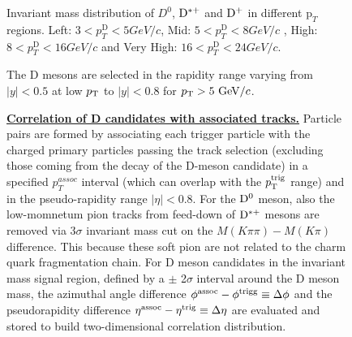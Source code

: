 \begin{enumerate}
\begin{figure}[h]
\caption{Invariant mass distribution of $D^0$, ${\rm D^{*+}}$ and ${\rm D^+}$ in different $\text{p}_T$ regions. Left: $3< p_{T}^{\text{D}}< 5 GeV/c$, Mid: $5< p_{T}^{\text{D}}< 8 GeV/c$ , High: $8< p_{T}^{\text{D}}< 16 GeV/c$ and Very High: $16<p_{T}^{\text{D}}< 24 GeV/c$.}
\label{fig:InvMass}
\end{figure}
\begin{figure}[h]


The D mesons are selected in the rapidity range varying from $|y|<0.5$ at low $p_{\rm T}$ to $|y|<0.8$ for $p_{\rm T}>5~\mathrm{GeV}/c$. %

\item
\underline {\bf Correlation of D candidates with associated tracks.}
Particle pairs are formed by associating each trigger particle with
the charged primary particles passing the track selection (excluding those coming from the decay of the D-meson candidate) in a specified $p^{assoc}_{T}$
interval (which can overlap with the $p_{\rm T}^{\rm trig}$ range) and in the pseudo-rapidity range $|\eta|<0.8$. For the ${\rm D^0}$ meson, also the low-momnetum pion tracks from feed-down of ${\rm D^{*+}}$ mesons are removed via 3$\sigma$ invariant mass cut on the $M(K\pi\pi)-M(K\pi)$ difference. This because these soft pion are not related to the charm quark fragmentation chain.
For D meson candidates in the invariant mass signal region, defined by a $\pm$ 2$\sigma$ interval around the D meson mass, the azimuthal angle difference $\phi^{\rm assoc}-\phi^{\rm trigg}\equiv\Delta\phi$
and the pseudorapidity difference $\eta^{\rm assoc}-\eta^{\rm trig}\equiv\Delta \eta$ are evaluated and stored to build two-dimensional correlation distribution. %


\end{figure}
\end{enumerate}
